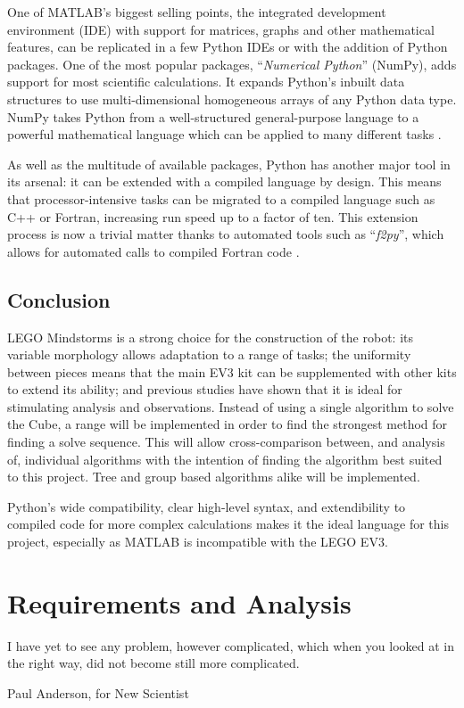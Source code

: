 \documentclass{report}
\newcommand{\tit}[1]{\textit{#1}}
\newcommand{\propernoun}[1]{\enquote{\tit{#1}}}
\newcommand{\lego}{LEGO }
\begin{document}
    One of MATLAB's biggest selling points, the integrated development environment (IDE) with support for matrices, graphs and other mathematical features, can be replicated in a few Python IDEs or with the addition of Python packages. One of the most popular packages, \propernoun{Numerical Python} (NumPy), adds support for most scientific calculations. It expands Python's inbuilt data structures to use multi-dimensional homogeneous arrays of any Python data type. NumPy takes Python from a well-structured general-purpose language to a powerful mathematical language which can be applied to many different tasks \cite{Cai2005, Oliphant2006}.
    
    As well as the multitude of available packages, Python has another major tool in its arsenal: it can be extended with a compiled language by design. This means that processor-intensive tasks can be migrated to a compiled language such as C++ or Fortran, increasing run speed up to a factor of ten. This extension process is now a trivial matter thanks to automated tools such as \propernoun{f2py}, which allows for automated calls to compiled Fortran code \cite{Oliphant2006}.
    
    \section{Conclusion}
    \lego Mindstorms is a strong choice for the construction of the robot: its variable morphology allows adaptation to a range of tasks; the uniformity between pieces means that the main EV3 kit can be supplemented with other kits to extend its ability; and previous studies have shown that it is ideal for stimulating analysis and observations. Instead of using a single algorithm to solve the Cube, a range will be implemented in order to find the strongest method for finding a solve sequence. This will allow cross-comparison between, and analysis of, individual algorithms with the intention of finding the algorithm best suited to this project. Tree and group based algorithms alike will be implemented.
    
    Python's wide compatibility, clear high-level syntax, and extendibility to compiled code for more complex calculations makes it the ideal language for this project, especially as MATLAB is incompatible with the \lego EV3.
   
    \newpage
    \chapter{Requirements and Analysis}
    \epigraph{I have yet to see any problem, however complicated, which when you looked at in the right way, did not become still more complicated.}{Paul Anderson, for New Scientist \cite{Anderson1969}}
    
\end{document}
